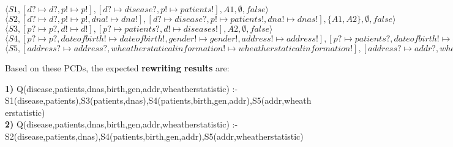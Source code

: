 \documentclass[12pt,a4paper,oneside]{report}
\begin{document}
\begin{flushleft}
$\langle S1, [d? \longmapsto d?, p! \longmapsto p!], [d? \longmapsto disease?, p! \longmapsto patients!], A1, \emptyset, false\rangle$ \\
$\langle S2, [d? \longmapsto d?, p! \longmapsto p!, dna! \longmapsto dna!], [d? \longmapsto disease?, p! \longmapsto patients!, dna! \longmapsto dnas!], \lbrace A1,A2 \rbrace, \emptyset, false\rangle$ \\
$\langle S3, [p? \longmapsto p?, d! \longmapsto d!], [p? \longmapsto patients?, d! \longmapsto diseases!], A2, \emptyset, false\rangle$ \\
$\langle S4, [p? \longmapsto p?, dateofbirth! \longmapsto dateofbirth!, gender! \longmapsto gender!, address! \longmapsto address!], [p? \longmapsto patients?, dateofbirth! \longmapsto birth!, gender! \longmapsto gen!, address! \longmapsto addr!], A3, \emptyset, false\rangle$ \\
$\langle S5, [address? \longmapsto address?, wheatherstaticalinformation! \longmapsto wheatherstaticalinformation!], [address? \longmapsto addr?, wheatherstaticalinformation! \longmapsto wheatherstatistic!], A4, \emptyset, false\rangle$ \\
\end{flushleft}

Based on these PCDs, the expected \textbf{rewriting results} are:

\begin{flushleft}
\textbf{1) }Q(disease,patients,dnas,birth,gen,addr,wheatherstatistic) :- S1(disease,patients),S3(patients,dnas),S4(patients,birth,gen,addr),S5(addr,wheatherstatistic) \\
\textbf{2) }Q(disease,patients,dnas,birth,gen,addr,wheatherstatistic) :- S2(disease,patients,dnas),S4(patients,birth,gen,addr),S5(addr,wheatherstatistic) \\
\end{flushleft}
\end{document}
